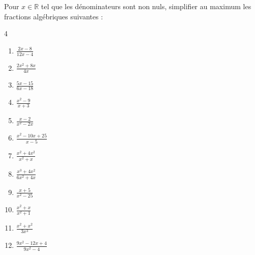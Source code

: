 \begin{exercise}[À vous]\label{chapitre02:fractionalgebriques:simplification} Pour $x\in\mathbb{R}$  tel que les dénominateurs sont non nuls, simplifier au maximum les fractions algébriques suivantes :\hfill 
	\begin{multicols}{4} 
		\begin{enumerate}[label={$\Alph*(x)=$\rule{0pt}{1.8em}}, leftmargin=*] 
			\item $\frac{2x-8}{12x-4}$
			\item $\frac{2x^2+8x}{4x}$ 
			\item $\frac{5x-15}{6x-18}$
			\item $\frac{x^2-9}{x+3}$
			\item $\frac{x-2}{x^2-2x}$  
			\item $\frac{x^2-10x+25}{x-5}$
			\item $\frac{x^2+4x^2}{x^2+x}$
			\item $\frac{x^3+4x^2}{6x^2+4x}$
			\item $\frac{x+5}{x^2-25}$ 
			\item $\frac{x^2+x}{x^2+1}$  	
			\item $\frac{x^2+x^2}{3x^3}$
			\item $\frac{9x^2-12x+4}{9x^2-4}$  
		\end{enumerate}
	\end{multicols}
\end{exercise}
 


